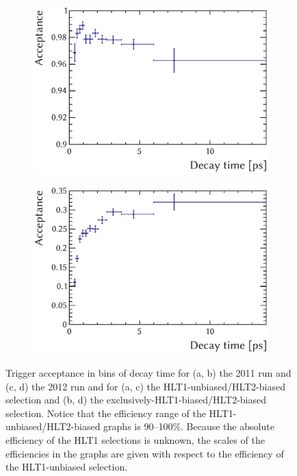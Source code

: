 \begin{figure}[htbp]
  \vspace*{0.02\textwidth}
  \begin{subfigure}{0.49\textwidth}
    \includegraphics[width=\textwidth]{graphics/analysis/trigTimeAcc_2012_UB}
    \caption{}
    \label{fig:trigAcc_2012_UB}
  \end{subfigure}%
  \hfill%
  \begin{subfigure}{0.49\textwidth}
    \includegraphics[width=\textwidth]{graphics/analysis/trigTimeAcc_2012_exclB}
    \caption{}
    \label{fig:trigAcc_2012_exclB}
  \end{subfigure}
  \caption{Trigger acceptance in bins of decay time for (a, b) the 2011 run and (c, d) the 2012 run
           and for (a, c) the HLT1-unbiased/HLT2-biased selection and (b, d) the exclusively-HLT1-biased/HLT2-biased selection.
           Notice that the efficiency range of the HLT1-unbiased/HLT2-biased graphs is 90--100\%.
           Because the absolute efficiency of the HLT1 selections is unknown, the scales of the efficiencies
           in the graphs are given with respect to the efficiency of the HLT1-unbiased selection.}
  \label{fig:trigAcc}
\end{figure}

